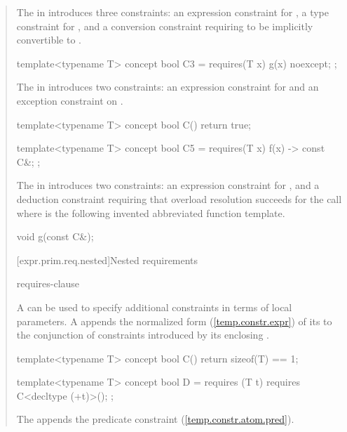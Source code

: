 \begin{quote}
The  in  
introduces three constraints: an expression constraint for , 
a type constraint for , and a conversion 
constraint requiring  to be implicitly convertible to
.

\begin{codeblock}
template<typename T> concept bool C3 =
  requires(T x) {
    {g(x)} noexcept;
  };
\end{codeblock}

The  in  
introduces two constraints: an expression constraint for  
and an exception constraint on .

\begin{codeblock}
template<typename T> concept bool C() { return true; }

template<typename T> concept bool C5 =
  requires(T x) {
    {f(x)} -> const C&;
  };
\end{codeblock}

The  in  
introduces two constraints: an expression constraint for , 
and a deduction constraint requiring that overload resolution succeeds for the
call  where  is the following
invented abbreviated function template.
\begin{codeblock}
void g(const C&);
\end{codeblock}
\exitexample

[expr.prim.req.nested]{Nested requirements}

\begin{bnf}
\br
    requires-clause \terminal{;}
  \end{bnf}

\pnum
A  can be used
to specify additional constraints in terms of local parameters.
%
A  appends the normalized form 
(\ref{temp.constr.expr}) of its  
to the conjunction of constraints introduced by its enclosing
.

\enterexample
\begin{codeblock}
template<typename T> concept bool C() { return sizeof(T) == 1; }

template<typename T> concept bool D =
  requires (T t) {
    requires C<decltype (+t)>();
  };
\end{codeblock}
The  appends the predicate constraint 
 (\ref{temp.constr.atom.pred}).
\exitexample

\end{quote}